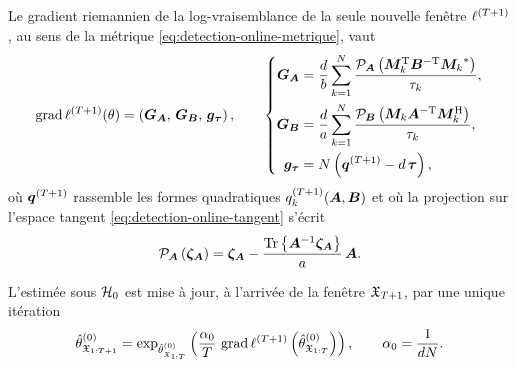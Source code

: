 \begin{proposition}
\label{prop:detection-online-gradient}
  Le gradient riemannien de la log-vraisemblance de la seule nouvelle fenêtre $\ell^{(T+1)}$, au sens de la métrique \cref{eq:detection-online-metrique}, vaut
  \begin{equation}
    \operatorname{\operatorname{grad}}\ell^{(T+1)}(\theta)
    =
    \left(\boldsymbol{G}_{\boldsymbol{A}},\,\boldsymbol{G}_{\boldsymbol{B}},\,\boldsymbol{g}_{\boldsymbol{\tau}}\right),
    \qquad
    \left\{
    \begin{aligned}
      \boldsymbol{G}_{\boldsymbol{A}} &= \frac{d}{b}\sum_{k=1}^{N}\frac{\mathcal{P}_{\boldsymbol{A}}\left(\boldsymbol{M}_k^{\mathrm{T}}\boldsymbol{B}^{-\mathrm{T}}{\boldsymbol{M}_k}^{*}\right)}{\tau_k},\\
      \boldsymbol{G}_{\boldsymbol{B}} &= \frac{d}{a}\sum_{k=1}^{N}\frac{\mathcal{P}_{\boldsymbol{B}}\left(\boldsymbol{M}_k\boldsymbol{A}^{-\mathrm{T}}\boldsymbol{M}_k^{\mathrm{H}}\right)}{\tau_k},\\
      \boldsymbol{g}_{\boldsymbol{\tau}} &= N\left(\boldsymbol{q}^{(T+1)}-d\,\boldsymbol{\tau}\right),
    \end{aligned}
    \right.
    \label{eq:detection-online-gradient}
  \end{equation}
  où $\boldsymbol{q}^{(T+1)}$ rassemble les formes quadratiques $q_k^{(T+1)}(\boldsymbol{A},\boldsymbol{B})$ et où la projection sur l'espace tangent \cref{eq:detection-online-tangent} s'écrit
  \begin{equation}
    \mathcal{P}_{\boldsymbol{A}}\left(\boldsymbol{\zeta}_{\boldsymbol{A}}\right)
    =
    \boldsymbol{\zeta}_{\boldsymbol{A}} - \frac{\operatorname{\operatorname{Tr}}\left\{{\boldsymbol{A}}^{-1}\boldsymbol{\zeta}_{\boldsymbol{A}}\right\}}{a}\,\boldsymbol{A}.
    \label{eq:detection-online-projection}
  \end{equation}
\end{proposition}

\begin{definition}
\label{def:detection-online-sgd}
  L'estimée sous $\mathcal{H}_0$ est mise à jour, à l'arrivée de la fenêtre $\mathfrak{X}_{T+1}$, par une unique itération
  \begin{equation}
    \hat{\theta}^{(0)}_{\mathfrak{X}_{1:T+1}}
    =
    \exp_{\hat{\theta}^{(0)}_{\mathfrak{X}_{1:T}}}
    \left(
      \frac{\alpha_0}{T}\,\operatorname{\operatorname{grad}}\ell^{(T+1)}\left(\hat{\theta}^{(0)}_{\mathfrak{X}_{1:T}}\right)
    \right),
    \qquad
    \alpha_0=\frac{1}{dN}.
    \label{eq:detection-online-sgd}
  \end{equation}
\end{definition}

